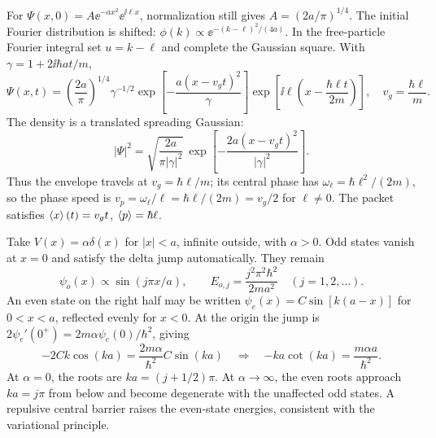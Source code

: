 For $\Psi(x,0)=A\ee^{-ax^2}\ee^{\ii\ell x}$,
normalization still gives $A=(2a/\pi)^{1/4}$.
The initial Fourier distribution is shifted:
$\phi(k)\propto\ee^{-(k-\ell)^2/(4a)}$.
In the free-particle Fourier integral set
$u=k-\ell$ and complete the Gaussian square.
With $\gamma=1+2\ii\hbar at/m$,
\begin{equation}
\boxed{\Psi(x,t)=
\left(\frac{2a}{\pi}\right)^{1/4}
\gamma^{-1/2}
\exp\left[-\frac{a(x-v_gt)^2}{\gamma}\right]
\exp\left[\ii\ell\left(x-\frac{\hbar\ell t}{2m}\right)\right]},
\quad v_g=\frac{\hbar\ell}{m}.
\end{equation}
The density is a translated spreading Gaussian:
\begin{equation}
|\Psi|^2=
\sqrt{\frac{2a}{\pi|\gamma|^2}}\,
\exp\left[-\frac{2a(x-v_gt)^2}{|\gamma|^2}\right].
\end{equation}
Thus the envelope travels at
$v_g=\hbar\ell/m$; its central phase has
$\omega_\ell=\hbar\ell^2/(2m)$, so
the phase speed is
$v_p=\omega_\ell/\ell=\hbar\ell/(2m)=v_g/2$
for $\ell\ne0$. The packet satisfies
$\left\langle x\right\rangle(t)=v_gt$, $\left\langle p\right\rangle=\hbar\ell$.

Take $V(x)=\alpha\delta(x)$ for $|x|<a$,
infinite outside, with $\alpha>0$.
Odd states vanish at $x=0$ and satisfy
the delta jump automatically. They remain
\begin{equation}
\psi_o(x)\propto\sin(j\pi x/a),\qquad
\boxed{E_{o,j}=\frac{j^2\pi^2\hbar^2}{2ma^2}}
\quad(j=1,2,\ldots).
\end{equation}
An even state on the right half may be written
$\psi_e(x)=C\sin[k(a-x)]$ for $0<x<a$,
reflected evenly for $x<0$.
At the origin the jump is
$2\psi_e'(0^+)=2m\alpha\psi_e(0)/\hbar^2$,
giving
\begin{equation}
-2Ck\cos(ka)=\frac{2m\alpha}{\hbar^2}C\sin(ka)
\quad\Rightarrow\quad
\boxed{-ka\cot(ka)=\frac{m\alpha a}{\hbar^2}}.
\end{equation}
At $\alpha=0$, the roots are $ka=(j+1/2)\pi$.
At $\alpha\to\infty$, the even roots approach
$ka=j\pi$ from below and become degenerate
with the unaffected odd states. A repulsive
central barrier raises the even-state energies,
consistent with the variational principle.

